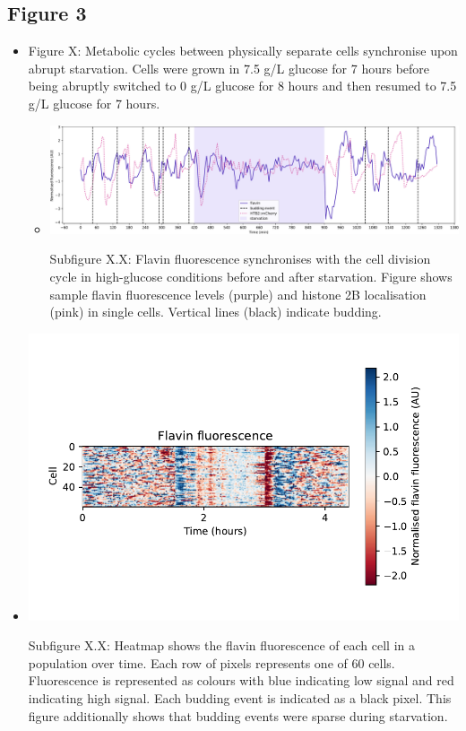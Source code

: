 \subsection{Figure 3}
\label{sec:org9b50c2e}
\begin{itemize}
\item Figure X: Metabolic cycles between physically separate cells synchronise upon abrupt starvation.  Cells were grown in 7.5 g/L glucose for 7 hours before being abruptly switched to 0 g/L glucose for 8 hours and then resumed to 7.5 g/L glucose for 7 hours.
\begin{itemize}
\item \begin{center}
\includegraphics[width=.9\linewidth]{starvation_single_birth_plot_new_edit.pdf}
\end{center} Subfigure X.X: Flavin fluorescence synchronises with the cell division cycle in high-glucose conditions before and after starvation.  Figure shows sample flavin fluorescence levels (purple) and histone 2B localisation (pink) in single cells.  Vertical lines (black) indicate budding.
\end{itemize}
\end{itemize}

\begin{itemize}
\item \begin{center}
\includegraphics[width=.9\linewidth]{fy4_19972_plots_butter_04.png}
\end{center} Subfigure X.X: Heatmap shows the flavin fluorescence of each cell in a population over time.  Each row of pixels represents one of 60 cells.  Fluorescence is represented as colours with blue indicating low signal and red indicating high signal.  Each budding event is indicated as a black pixel.  This figure additionally shows that budding events were sparse during starvation.
\end{itemize}


